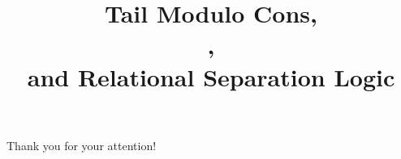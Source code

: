 \documentclass[aspectratio=169]{beamer}
\title{
	Tail Modulo Cons, \\
	\OCaml, \\
	and Relational Separation Logic
}
\date{}
\begin{document}

\begin{frame}
\titlepage
\end{frame}









\begin{frame}
\LARGE
\begin{center}
  Thank you for your attention!
\end{center}
\end{frame}


%

\end{document}
